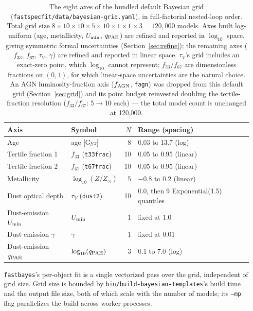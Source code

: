 \documentclass[12pt]{article}
\begin{document}
\begin{table}[h]
\centering
\renewcommand{\arraystretch}{1.4}
\begin{tabular}{@{}llrl@{}}
\toprule
Axis & Symbol & $N$ & Range (spacing) \\
\midrule
Age & age [Gyr] & 8 & 0.03 to 13.7 (log) \\
Tertile fraction 1 & $f_{33}$ (\texttt{t33frac}) & 10 & 0.05 to 0.95 (linear) \\
Tertile fraction 2 & $f_{67}$ (\texttt{t67frac}) & 10 & 0.05 to 0.95 (linear) \\
Metallicity & $\log_{10}(Z/Z_\odot)$ & 5 & $-0.8$ to $0.2$ (linear) \\
Dust optical depth & $\tau_V$ (\texttt{dust2}) & 10 & 0.0, then 9 Exponential(1.5) quantiles \\
Dust-emission $U_{\rm min}$ & $U_{\rm min}$ & 1 & fixed at 1.0 \\
Dust-emission $\gamma$ & $\gamma$ & 1 & fixed at 0.01 \\
Dust-emission $q_{\rm PAH}$ & $\log_{10}(q_{\rm PAH})$ & 3 & 0.1 to 7.0 (log) \\
\bottomrule
\end{tabular}
\caption{The eight axes of the bundled default Bayesian grid
  (\texttt{fastspecfit/data/bayesian-grid.yaml}), in full-factorial
  nested-loop order. Total grid size
  $8\times10\times10\times5\times10\times1\times1\times3 = 120{,}000$
  models. Axes built log-uniform (age, metallicity, $U_{\rm min}$,
  $q_{\rm PAH}$) are refined and reported in $\log_{10}$ space, giving
  symmetric formal uncertainties (Section~\ref{sec:refine}); the
  remaining axes ($f_{33}$, $f_{67}$, $\tau_V$, $\gamma$) are refined and
  reported in linear space. $\tau_V$'s grid includes an exact-zero point,
  which $\log_{10}$ cannot represent; $f_{33}$/$f_{67}$ are dimensionless
  fractions on $(0,1)$, for which linear-space uncertainties are the
  natural choice. An AGN luminosity-fraction axis ($f_{\rm AGN}$,
  \texttt{fagn}) was dropped from this default grid (Section~\ref{sec:grid})
  and its point budget reinvested doubling the tertile-fraction
  resolution ($f_{33}$/$f_{67}$: 5$\to$10 each) --- the total model count
  is unchanged at 120{,}000.}
\label{tab:grid}
\end{table}

\texttt{fastbayes}'s per-object fit is a single vectorized pass over the
grid, independent of grid size. Grid size is bounded by
\texttt{bin/build-bayesian-templates}'s build time and the output file
size, both of which scale with the number of models; its \texttt{--mp}
flag parallelizes the build across worker processes.
\end{document}
